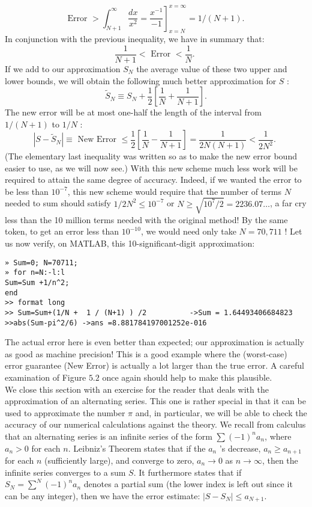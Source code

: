 \documentclass[../main.tex]{subfiles}
\begin{document}
$$
\text { Error } \left.>\int_{N+1}^{\infty} \frac{d x}{x^{2}}=\frac{x^{-1}}{-1}\right]_{x=N}^{x=\infty}=1 /(N+1) \text {. }
$$
In conjunction with the previous inequality, we have in summary that:
$$
\frac{1}{N+1}<\text { Error }<\frac{1}{N} \text {. }
$$
If we add to our approximation $S_{N}$ the average value of these two upper and lower bounds, we will obtain the following much better approximation for $S$ :
$$
\tilde{S}_{N} \equiv S_{N}+\frac{1}{2}\left[\frac{1}{N}+\frac{1}{N+1}\right] .
$$
The new error will be at most one-half the length of the interval from $1 /(N+1)$ to $1 / N$ :
$$
\left|S-\tilde{S}_{N}\right| \equiv \text { New Error } \leq \frac{1}{2}\left[\frac{1}{N}-\frac{1}{N+1}\right]=\frac{1}{2 N(N+1)}<\frac{1}{2 N^{2}} \text {. }
$$
(The elementary last inequality was written so as to make the new error bound easier to use, as we will now see.) With this new scheme much less work will be required to attain the same degree of accuracy. Indeed, if we wanted the error to be less than $10^{-7}$, this new scheme would require that the number of terms $N$ needed to sum should satisfy $1 / 2 N^{2} \leq 10^{-7}$ or $N \geq \sqrt{10^{7} / 2}=2236.07 \ldots$, a far cry less than the 10 million terms needed with the original method! By the same token, to get an error less than $10^{-10}$, we would need only take $N=70,711$ ! Let us now verify, on MATLAB, this 10-significant-digit approximation:

\begin{verbatim}
» Sum=0; N=70711;
» for n=N:-l:l
Sum=Sum +1/n^2;
end
>> format long
>> Sum=Sum+(1/N +  1 / (N+1) ) /2          ->Sum = 1.64493406684823
>>abs(Sum-pi^2/6) ->ans =8.881784197001252e-016 
\end{verbatim}

The actual error here is even better than expected; our approximation is actually as good as machine precision! This is a good example where the (worst-case) error guarantee (New Error) is actually a lot larger than the true error. A careful examination of Figure $5.2$ once again should help to make this plausible.\\

We close this section with an exercise for the reader that deals with the approximation of an alternating series. This one is rather special in that it can be used to approximate the number $\pi$ and, in particular, we will be able to check the accuracy of our numerical calculations against the theory. We recall from calculus that an alternating series is an infinite series of the form $\sum(-1)^{n} a_{n}$, where $a_{n}>0$ for each $n$. Leibniz's Theorem states that if the $a_{n}$ 's decrease, $a_{n} \geq a_{n+1}$ for each $n$ (sufficiently large), and converge to zero, $a_{n} \rightarrow 0$ as $n \rightarrow \infty$, then the infinite series converges to a sum $S$. It furthermore states that if $S_{N}=\sum^{N}(-1)^{n} a_{n}$ denotes a partial sum (the lower index is left out since it can be any integer), then we have the error estimate: $\left|S-S_{N}\right| \leq a_{N+1}$.\\
\end{document}
